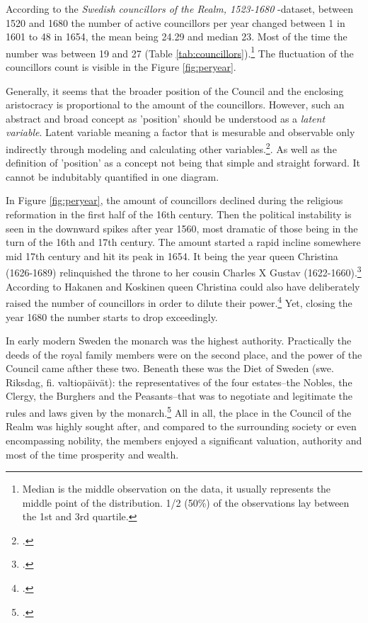 According to the \textit{Swedish councillors of the Realm, 1523-1680} -dataset, between 1520 and 1680 the number of active councillors per year changed between 1 in 1601 to 48 in 1654, the mean being 24.29 and median 23. Most of the time the number was between 19 and 27 (Table \ref{tab:councillors}).\footnote{Median is the middle observation on the data, it usually represents the middle point of the distribution.\cites[p. 26,]{statisticsfor}[pp. 30-31.]{MooreEtAl} 1/2 (50\%) of the observations lay between the 1st and 3rd quartile.\cite[pp. 32-33.]{MooreEtAl}} The fluctuation of the councillors count is visible in the Figure \ref{fig:peryear}. 

Generally, it seems that the broader position of the Council and the enclosing aristocracy is proportional to the amount of the councillors. However, such an abstract and broad concept as 'position' should be understood as a \textit{latent variable}. Latent variable meaning a factor that is mesurable and observable only indirectly through modeling and calculating other variables.\footcite{apa}. As well as the definition of 'position' as a concept not being that simple and straight forward. It cannot be indubitably quantified in one diagram.

In Figure \ref{fig:peryear}, the amount of councillors declined during the religious reformation in the first half of the 16th century. Then the political instability is seen in the downward spikes after year 1560, most dramatic of those being in the turn of the 16th and 17th century. The amount started a rapid incline somewhere mid 17th century and hit its peak in 1654. It being the year queen Christina (1626-1689) relinquished the throne to her cousin Charles X Gustav (1622-1660).\footcite[pp. 8-9.]{personalAgency} According to Hakanen and Koskinen queen Christina could also have deliberately raised the number of councillors in order to dilute their power.\footcite[pp. 63-64.]{HakanenAKoskinen2017} Yet, closing the year 1680 the number starts to drop exceedingly.

In early modern Sweden the monarch was the highest authority. Practically the deeds of the royal family members were on the second place, and the power of the Council came afther these two. Beneath these was the Diet of Sweden (swe. Riksdag, fi. valtiopäivät): the representatives of the four estates–the Nobles, the Clergy, the Burghers and the Peasants–that was to negotiate and legitimate the rules and laws given by the monarch.\footcite[pp. 57-61.]{pSuurvalta}  All in all, the place in the Council of the Realm was highly sought after, and compared to the surrounding society or even encompassing nobility, the members enjoyed a significant valuation, authority and most of the time prosperity and wealth.

